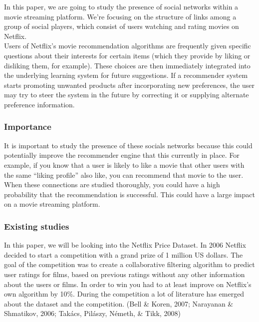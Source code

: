 \documentclass[
  english,
  man,floatsintext]{apa6}
\begin{document}
In this paper, we are going to study the presence of social networks within a movie streaming platform. We're focusing on the structure of links among a group of social players, which consist of users watching and rating movies on Netflix.\\
Users of Netflix's movie recommendation algorithms are frequently given specific questions about their interests for certain items (which they provide by liking or disliking them, for example). These choices are then immediately integrated into the underlying learning system for future suggestions. If a recommender system starts promoting unwanted products after incorporating new preferences, the user may try to steer the system in the future by correcting it or supplying alternate preference information.

\hypertarget{importance}{%
\subsubsection{Importance}\label{importance}}

It is important to study the presence of these socials networks because this could potentially improve the recommender engine that this currently in place. For example, if you know that a user is likely to like a movie that other users with the same ``liking profile'' also like, you can recommend that movie to the user. When these connections are studied thoroughly, you could have a high probability that the recommendation is successful. This could have a large impact on a movie streaming platform.

\hypertarget{existing-studies}{%
\subsubsection{Existing studies}\label{existing-studies}}

In this paper, we will be looking into the Netflix Price Dataset. In 2006 Netflix decided to start a competition with a grand prize of 1 million US dollars. The goal of the competition was to create a collaborative filtering algorithm to predict user ratings for films, based on previous ratings without any other information about the users or films. In order to win you had to at least improve on Netflix's own algorithm by 10\%.
During the competition a lot of literature has emerged about the dataset and the competition. (Bell \& Koren, 2007; Narayanan \& Shmatikov, 2006; Takács, Pilászy, Németh, \& Tikk, 2008)
\end{document}
